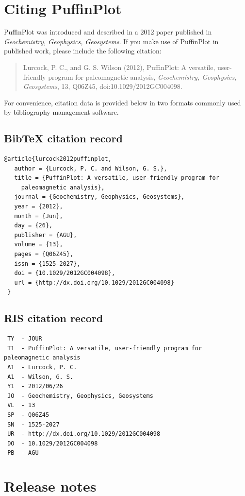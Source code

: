 \documentclass[a4paper,british]{article}
\begin{document}
\clearpage
\appendix
\section{Citing PuffinPlot\label{sec:citing-puffinplot}}

PuffinPlot was introduced and described in a 2012 paper published
in \emph{Geochemistry, Geophysics, Geosystems}. If you make use of
PuffinPlot in published work, please include the following citation:

\begin{quote}
Lurcock, P. C., and G. S. Wilson (2012), PuffinPlot: A versatile,
user-friendly program for paleomagnetic analysis, \emph{Geochemistry,
  Geophysics, Geosystems}, 13, Q06Z45, doi:10.1029/2012GC004098.
\end{quote}

\noindent For convenience, citation data is provided below in two formats
commonly used by bibliography management software.

\subsection*{BibTeX citation record}
\small
\begin{verbatim}
@article{lurcock2012puffinplot,
   author = {Lurcock, P. C. and Wilson, G. S.},
   title = {PuffinPlot: A versatile, user-friendly program for
     paleomagnetic analysis},
   journal = {Geochemistry, Geophysics, Geosystems},
   year = {2012},
   month = {Jun},
   day = {26},
   publisher = {AGU},
   volume = {13},
   pages = {Q06Z45},
   issn = {1525-2027},
   doi = {10.1029/2012GC004098},
   url = {http://dx.doi.org/10.1029/2012GC004098}
 }
\end{verbatim}

\subsection*{RIS citation record}
\small
\begin{verbatim}
 TY  - JOUR
 T1  - PuffinPlot: A versatile, user-friendly program for paleomagnetic analysis
 A1  - Lurcock, P. C.
 A1  - Wilson, G. S.
 Y1  - 2012/06/26
 JO  - Geochemistry, Geophysics, Geosystems
 VL  - 13
 SP  - Q06Z45
 SN  - 1525-2027
 UR  - http://dx.doi.org/10.1029/2012GC004098
 DO  - 10.1029/2012GC004098
 PB  - AGU
\end{verbatim}

\section{Release notes}
\end{document}
